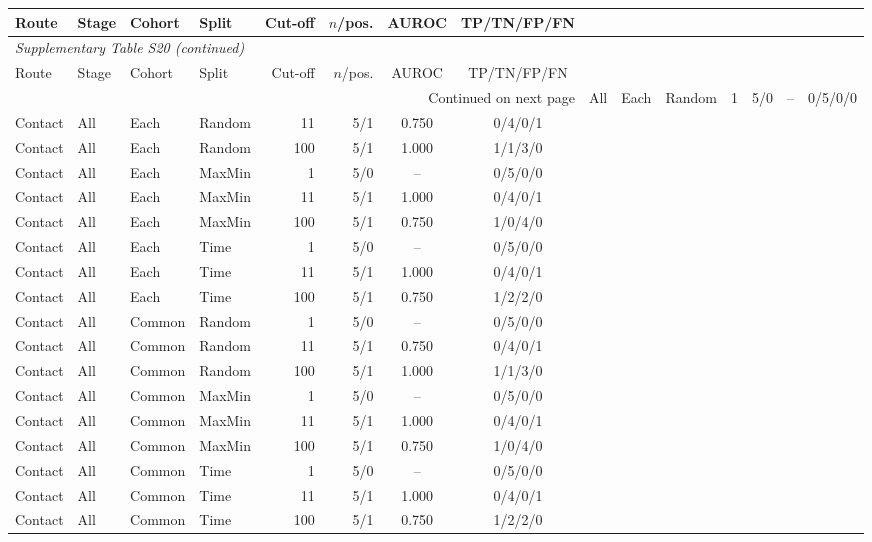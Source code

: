 \begingroup\small\setlength{\tabcolsep}{4pt}

\begin{longtable}{llllrrcc}

\toprule Route & Stage & Cohort & Split & Cut-off & $n$/pos. & AUROC & TP/TN/FP/FN \\ \midrule\endfirsthead

\multicolumn{8}{l}{\textit{Supplementary Table S20 (continued)}} \\

\toprule Route & Stage & Cohort & Split & Cut-off & $n$/pos. & AUROC & TP/TN/FP/FN \\ \midrule\endhead

\midrule\multicolumn{8}{r}{Continued on next page}\endfoot\bottomrule\endlastfoot

Contact & All & Each & Random & 1 & 5/0 & -- & 0/5/0/0 \\
Contact & All & Each & Random & 11 & 5/1 & 0.750 & 0/4/0/1 \\
Contact & All & Each & Random & 100 & 5/1 & 1.000 & 1/1/3/0 \\
Contact & All & Each & MaxMin & 1 & 5/0 & -- & 0/5/0/0 \\
Contact & All & Each & MaxMin & 11 & 5/1 & 1.000 & 0/4/0/1 \\
Contact & All & Each & MaxMin & 100 & 5/1 & 0.750 & 1/0/4/0 \\
Contact & All & Each & Time & 1 & 5/0 & -- & 0/5/0/0 \\
Contact & All & Each & Time & 11 & 5/1 & 1.000 & 0/4/0/1 \\
Contact & All & Each & Time & 100 & 5/1 & 0.750 & 1/2/2/0 \\
Contact & All & Common & Random & 1 & 5/0 & -- & 0/5/0/0 \\
Contact & All & Common & Random & 11 & 5/1 & 0.750 & 0/4/0/1 \\
Contact & All & Common & Random & 100 & 5/1 & 1.000 & 1/1/3/0 \\
Contact & All & Common & MaxMin & 1 & 5/0 & -- & 0/5/0/0 \\
Contact & All & Common & MaxMin & 11 & 5/1 & 1.000 & 0/4/0/1 \\
Contact & All & Common & MaxMin & 100 & 5/1 & 0.750 & 1/0/4/0 \\
Contact & All & Common & Time & 1 & 5/0 & -- & 0/5/0/0 \\
Contact & All & Common & Time & 11 & 5/1 & 1.000 & 0/4/0/1 \\
Contact & All & Common & Time & 100 & 5/1 & 0.750 & 1/2/2/0 \\

\end{longtable}
